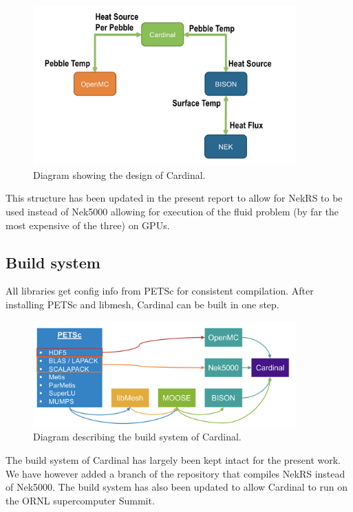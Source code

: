 \begin{figure}[!h]
\centering
\includegraphics[clip=true,width=0.9\textwidth]{Figures/cardinal}
\caption{Diagram showing the design of Cardinal.}
\label{f:cardinal}
\end{figure}

This structure has been updated in the present report to allow for NekRS to be used instead of Nek5000 allowing for execution of the fluid problem (by far the most expensive of the three) on GPUs.

\subsection{Build system}
\label{ss:c2}

All libraries get config info from PETSc for consistent compilation. After installing PETSc and libmesh, Cardinal can be built in one step.

\begin{figure}[!h]
\centering
\includegraphics[clip=true,width=0.9\textwidth]{Figures/build}
\caption{Diagram describing the build system of Cardinal.}
\label{f:build}
\end{figure}

The build system of Cardinal has largely been kept intact for the present work. We have however added a branch of the repository that compiles NekRS instead of Nek5000. The build system has also been updated to allow Cardinal to run on the ORNL supercomputer Summit.


